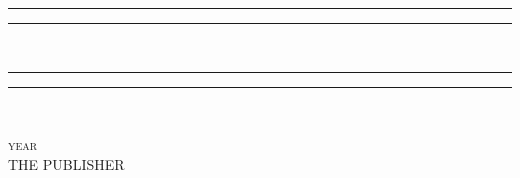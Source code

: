 \documentclass[oneside]{book}
\title{\textfrak{Kalevala}}
\author{\textfrak{koonnut:\\Elias Lönnrot}}
\begin{document}
\begin{titlepage}
    \centering
   
    \textcolor{BrickRed}{\rule{\textwidth}{1.6pt}\vspace*{-\baselineskip}\vspace*{2pt}
    \rule{\textwidth}{0.4pt}}\\[\baselineskip]
    \Huge{}
    \textcolor{BrickRed}{\rule{\textwidth}{0.4pt}\vspace*{-\baselineskip}\vspace{3.2pt}
    \rule{\textwidth}{1.6pt}}\\[\baselineskip]

    \vspace*{2\baselineskip}
    
    \LARGE{}
    
    \vfill
    {\scshape year} \\
    {\large THE PUBLISHER}\par
	\end{titlepage}
	
\end{document}
